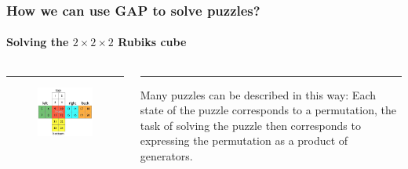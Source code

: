 \documentclass{beamer}
\theoremstyle{definition}
\theoremstyle{remark}
\begin{document}
\begin{frame}
	\frametitle{How we can use GAP to solve puzzles?}
	\framesubtitle{Solving the $ 2 \times 2 \times 2 $ Rubiks cube}
	\begin{columns}[T] %
		\begin{column}{.48\textwidth}
			\color{red}\rule{\linewidth}{4pt}
			\begin{figure}
				\includegraphics[scale=0.4]{Rubik}
			\end{figure}
		\end{column}%
		\hfill%
		\begin{column}{.48\textwidth}
			\color{blue}\rule{\linewidth}{4pt}
			\centering Many puzzles can be described in this way: Each state of the puzzle corresponds to a
			permutation, the task of solving the puzzle then corresponds to expressing the permutation as a
			product of generators.
		\end{column}%
	\end{columns}
\end{frame}
\end{document}
